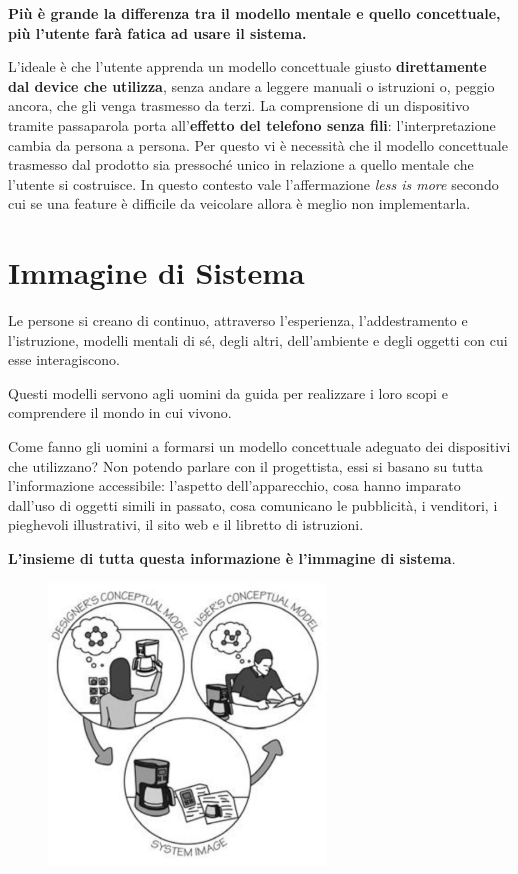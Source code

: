 \textbf{Più è grande la differenza tra il modello mentale e quello concettuale, più l'utente farà fatica ad usare il sistema.}

L'ideale è che l'utente apprenda un modello concettuale giusto \textbf{direttamente dal device che utilizza}, senza andare a leggere manuali o istruzioni o, peggio ancora, che gli venga trasmesso da terzi. La comprensione di un dispositivo tramite passaparola porta all'\textbf{effetto del telefono senza fili}: l'interpretazione cambia da persona a persona. Per questo vi è necessità che il modello concettuale trasmesso dal prodotto sia pressoché unico in relazione a quello mentale che l'utente si costruisce. In questo contesto vale l'affermazione \textit{less is more} secondo cui se una feature è difficile da veicolare allora è meglio non implementarla.

\pagebreak

\section{Immagine di Sistema}
Le persone si creano di continuo, attraverso l'esperienza, l'addestramento e l'istruzione, modelli mentali di sé, degli altri, dell'ambiente e degli oggetti con cui esse interagiscono.

Questi modelli servono agli uomini da guida per realizzare i loro scopi e comprendere il mondo in cui vivono.

Come fanno gli uomini a formarsi un modello concettuale adeguato dei dispositivi che utilizzano? Non potendo parlare con il progettista, essi si basano su tutta l'informazione accessibile: l'aspetto dell'apparecchio, cosa hanno imparato dall'uso di oggetti simili in passato, cosa comunicano le pubblicità, i venditori, i pieghevoli illustrativi, il sito web e il libretto di istruzioni.

\textbf{L'insieme di tutta questa informazione è l'immagine di sistema}.

\begin{figure}[!h]
	\centering
	\includegraphics[scale = 0.75]{"immagini/Immagine di Sistema"}
\end{figure}

